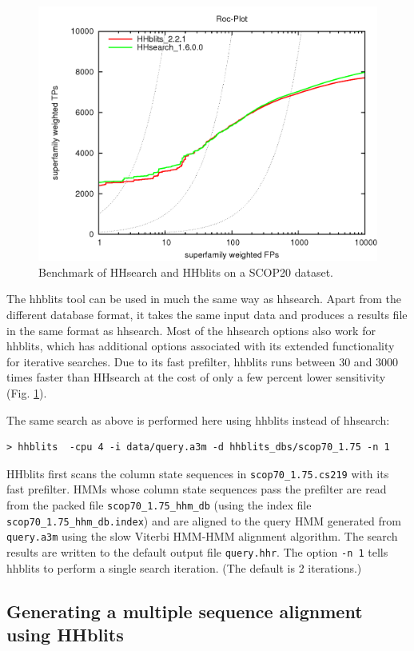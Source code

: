 \documentclass[11pt,a4paper]{article}
\begin{document}
\begin{figure}[h]
\begin{center}
\includegraphics[width=0.5 \textwidth]{hhblits-hhsearch.png}
\caption{Benchmark of HHsearch and HHblits on a SCOP20 dataset.}
\label{fig:hhsearch_hhblits_bench}
\end{center}
\end{figure}

The hhblits tool can be used in much the same way as hhsearch. 
Apart from the different database format, it takes the same input data and produces a results file in 
the same format as hhsearch. Most of the hhsearch options also work for hhblits, which has
additional options associated with its extended functionality for iterative searches. 
Due to its fast prefilter, hhblits runs between 30 and 3000 times faster than HHsearch
at the cost of only a few percent lower sensitivity (Fig. \ref{fig:hhsearch_hhblits_bench}).

The same search as above is performed here using hhblits instead of hhsearch:
\begin{verbatim}
> hhblits  -cpu 4 -i data/query.a3m -d hhblits_dbs/scop70_1.75 -n 1
\end{verbatim}

HHblits first scans the column state sequences in \verb`scop70_1.75.cs219` with its fast prefilter. HMMs whose column state sequences pass the prefilter are read from the packed file \verb`scop70_1.75_hhm_db` (using the index file \verb`scop70_1.75_hhm_db.index`) and are aligned to the query HMM generated from \verb`query.a3m` using the slow Viterbi HMM-HMM alignment algorithm. The search results are written to the default output file \verb`query.hhr`. The option \verb`-n 1` tells hhblits to perform a single search iteration. (The default is 2 iterations.)


\subsection{Generating a multiple sequence alignment using HHblits}\label{msa_hhblits}
\end{document}
